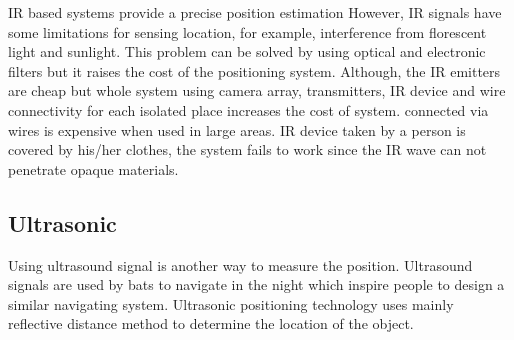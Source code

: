 IR based systems provide a precise position estimation 
However, IR signals have some limitations for sensing location, 
for example, interference from florescent light and sunlight. 
This problem can be solved by using optical and electronic filters 
but it raises the cost of the positioning system. 
Although, the IR emitters are cheap but whole system using camera array, 
transmitters, IR device and wire connectivity for each isolated 
place increases the cost of system.
connected via wires is expensive when used in large areas. 
IR device taken by a person is covered by his/her clothes,
the system fails to work since the IR wave can not penetrate
opaque materials.


\subsection{Ultrasonic}
\label{sec:ultrasonic}
Using ultrasound signal is another way to measure the position. 
Ultrasound signals are used by bats to navigate
in the night which inspire people to design a similar navigating
system. Ultrasonic positioning technology uses mainly reflective distance method to
determine the location of the object. 

